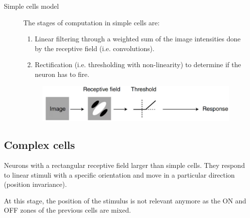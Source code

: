 \begin{description}
    \item[Simple cells model] 
        The stages of computation in simple cells are:
        \begin{enumerate}
            \item Linear filtering through a weighted sum of the image intensities done by the receptive field (i.e. convolutions).
            \item Rectification (i.e. thresholding with non-linearity) to determine if the neuron has to fire.
        \end{enumerate}

        \begin{figure}[H]
            \centering
            \includegraphics[width=0.4\linewidth]{./img/simple_cell_model.png}
        \end{figure}
\end{description}


\subsection{Complex cells}

Neurons with a rectangular receptive field larger than simple cells.
They respond to linear stimuli with a specific orientation and move in a particular direction (position invariance).

\begin{remark}
    At this stage, the position of the stimulus is not relevant anymore as the ON and OFF zones of the previous cells are mixed.
\end{remark}

